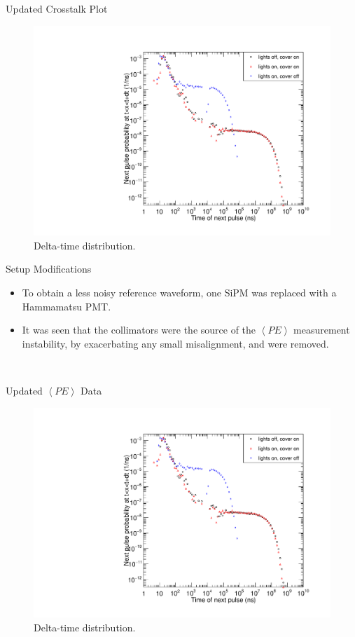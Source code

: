 \documentclass{beamer}
\begin{document}
\begin{frame}{Updated Crosstalk Plot}
\begin{figure}
\centering
\includegraphics[height=0.5\textwidth]{LightLeak.pdf}
\caption{Delta-time distribution.}
\end{figure}
\end{frame}

\begin{frame}{Setup Modifications}
\begin{itemize}
\item To obtain a less noisy reference waveform, one SiPM was replaced with a Hammamatsu PMT.
\item It was seen that the collimators were the source of the $\left< PE \right>$ measurement instability, by exacerbating any small misalignment, and were removed. 
\end{itemize}
\end{frame}
\\
\begin{frame}{Updated $\left< PE \right>$ Data}
\begin{figure}
\centering
\includegraphics[height=0.5\textwidth]{LightLeak.pdf}
\caption{Delta-time distribution.}
\end{figure}
\end{frame}
\end{document}
